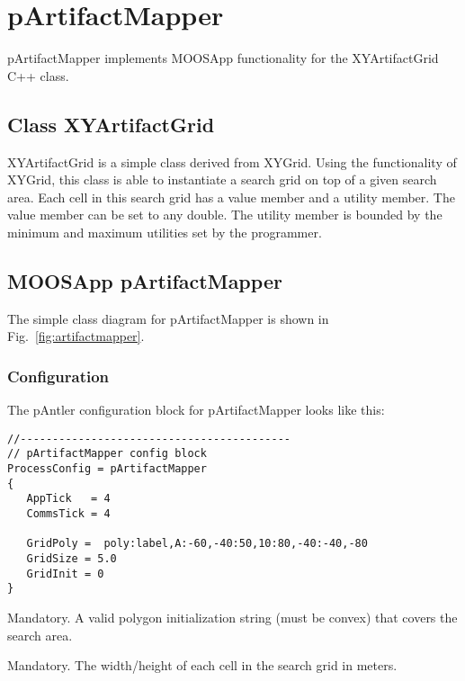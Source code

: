 \section{pArtifactMapper}
\label{pArtifactMapper}

pArtifactMapper implements MOOSApp functionality for the XYArtifactGrid C++ class.

\subsection{Class XYArtifactGrid}
\label{classXYArtifactGrid}

XYArtifactGrid is a simple class derived from XYGrid.  Using the functionality of XYGrid, this class is able to instantiate a search grid on top of a given search area.  Each cell in this search grid has a value member and a utility member.  The value member can be set to any double.  The utility member is bounded by the minimum and maximum utilities set by the programmer.

\subsection{MOOSApp pArtifactMapper}
\label{apppArtifactMapper}
The simple class diagram for pArtifactMapper is shown in Fig.~\ref{fig:artifactmapper}.


\subsubsection{Configuration}
The pAntler configuration block for pArtifactMapper looks like this:
\scriptsize
\begin{verbatim}
//------------------------------------------
// pArtifactMapper config block
ProcessConfig = pArtifactMapper
{
   AppTick   = 4
   CommsTick = 4
   
   GridPoly =  poly:label,A:-60,-40:50,10:80,-40:-40,-80
   GridSize = 5.0
   GridInit = 0
}
\end{verbatim}
\normalsize

\begin{hangpar}{\pin}{}
Mandatory. A valid polygon initialization string (must be convex) that covers the search area.
\end{hangpar}

\begin{hangpar}{\pin}{}
Mandatory. The width/height of each cell in the search grid in meters.
\end{hangpar}

